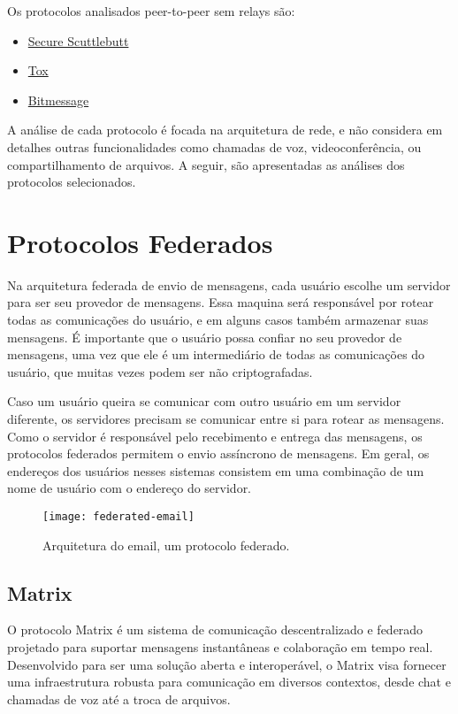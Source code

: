 Os protocolos analisados peer-to-peer sem relays são:
\begin{itemize}
  \item \href{https://scuttlebutt.nz/}{Secure Scuttlebutt}
  \item \href{https://tox.chat/}{Tox}
  \item \href{https://bitmessage.org/}{Bitmessage}
\end{itemize}

A análise de cada protocolo é focada na arquitetura de rede, e não considera em detalhes outras funcionalidades como chamadas de voz, videoconferência, ou compartilhamento de arquivos. A seguir, são apresentadas as análises dos protocolos selecionados.

\section{Protocolos Federados}

Na arquitetura federada de envio de mensagens, cada usuário escolhe um servidor para ser seu provedor de mensagens. Essa maquina será responsável por rotear todas as comunicações do usuário, e em alguns casos também armazenar suas mensagens. É importante que o usuário possa confiar no seu provedor de mensagens, uma vez que ele é um intermediário de todas as comunicações do usuário, que muitas vezes podem ser não criptografadas.

Caso um usuário queira se comunicar com outro usuário em um servidor diferente, os servidores precisam se comunicar entre si para rotear as mensagens. Como o servidor é responsável pelo recebimento e entrega das mensagens, os protocolos federados permitem o envio assíncrono de mensagens. Em geral, os endereços dos usuários nesses sistemas consistem em uma combinação de um nome de usuário com o endereço do servidor.

\begin{figure}
  \centering
  \texttt{[image: federated-email]}

  \caption{Arquitetura do email, um protocolo federado. \cite{email-picture}}
\end{figure}

\subsection{Matrix}

O protocolo Matrix é um sistema de comunicação descentralizado e federado projetado para suportar mensagens instantâneas e colaboração em tempo real. Desenvolvido para ser uma solução aberta e interoperável, o Matrix visa fornecer uma infraestrutura robusta para comunicação em diversos contextos, desde chat e chamadas de voz até a troca de arquivos. \cite{matrixspec}


